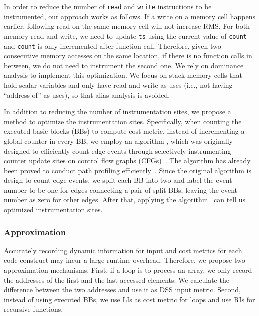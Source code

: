 In order to reduce the number of \texttt{read} and \texttt{write} instructions
to be instrumented, our approach works as follows. 
If a write on a memory cell happens earlier, 
following read on the same memory cell will not increase RMS.
For both memory read and write, 
we need to update \texttt{ts} using the current 
value of \texttt{count} and \texttt{count} is only incremented after function call. 
Therefore, given two consecutive memory accesses on the same location,
if there is no function calls in between, 
we do not need to instrument the second one. 
We rely on dominance analysis to implement this optimization. 
We focus on stack memory cells that hold scalar variables 
and only have read and write as uses 
(i.e., not having ``address of'' as uses), 
so that alias analysis is avoided. 

In addition to reducing the number of instrumentation sites,
we propose a method to optimize the instrumentation sites.
Specifically, when counting the executed basic blocks (BBs)
to compute cost metric, 
instead of incrementing a global counter in every BB,
we employ an algorithm , which was originally designed to efficiently 
count edge events through selectively instrumenting counter update sites 
on control flow graphs (CFGs)~\cite{event-counting}.
The algorithm has already been proved to conduct path 
profiling efficiently~\cite{path-profiling,peter-ase}.  
Since the original algorithm is design to count edge events, 
we split each BB into two and label the event number to be one for 
edges connecting a pair of split BBs, 
leaving the event number as zero for other edges. 
After that, applying the algorithm~\cite{event-counting}
can tell us optimized instrumentation sites. 


\subsubsection{Approximation}


Accurately recording dynamic information for input and cost metrics
for each code construct
may incur a large runtime overhead.
Therefore, we propose two approximation mechanisms. 
First, if a loop is to process an array, 
we only record the addresses of the first 
and the last accessed elements. 
We calculate the difference between the two addresses and use it as DSS input metric. 
Second, instead of using executed BBs, 
we use LIs as cost metric for loops 
and use RIs for recursive functions. 


